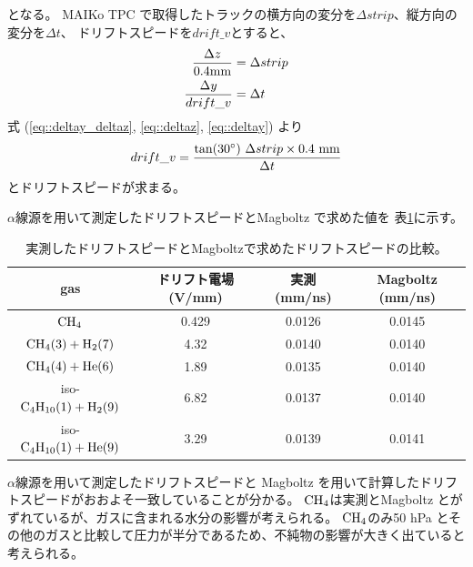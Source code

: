 \documentclass[../master]{subfiles}
\begin{document}
となる。
MAIKo TPC で取得したトラックの横方向の変分を$\Delta strip$、縦方向の変分を$\Delta t$、
ドリフトスピードを$drift\_v$とすると、
\begin{align}
  \frac{\Delta z}{0.4 {\rm mm}} & = \Delta strip \label{eq::deltaz}\\
  \frac{\Delta y}{drift\_v} & = \Delta t \label{eq::deltay}
\end{align}
式 (\ref{eq::deltay_deltaz}, \ref{eq::deltaz}, \ref{eq::deltay}) より
\begin{equation}
  drift\_v = \frac{\tan(30^{\circ})~\Delta strip\times0.4~{\rm mm}}{\Delta t}
\end{equation}
とドリフトスピードが求まる。

$\alpha$線源を用いて測定したドリフトスピードとMagboltz で求めた値を
表\ref{tab::drift_speed_compare}に示す。
\begin{table}
  \centering
  \caption{実測したドリフトスピードとMagboltzで求めたドリフトスピードの比較。}
  \label{tab::drift_speed_compare}
  \begin{tabular}{cccc}
    \toprule
    gas & ドリフト電場 (V/mm) & 実測 (mm/ns) & Magboltz (mm/ns)\\
    \midrule
    ${\rm CH_{4}}$ & 0.429 & 0.0126 & 0.0145 \\
    ${\rm CH_{4}} (3) + {\rm H_{2}} (7)$ & 4.32 & 0.0140 & 0.0140 \\
    ${\rm CH_{4}} (4) + {\rm He} (6)$ & 1.89 & 0.0135 & 0.0140 \\
    iso-${\rm C_{4}H_{10}} (1) + {\rm H_{2}} (9)$ & 6.82 & 0.0137 & 0.0140 \\
    iso-${\rm C_{4}H_{10}} (1) + {\rm He} (9)$ & 3.29 & 0.0139 & 0.0141 \\
    \bottomrule
  \end{tabular}
\end{table}
$\alpha$線源を用いて測定したドリフトスピードと Magboltz を用いて計算したドリフトスピードがおおよそ一致していることが分かる。
$\rm CH_{4}$は実測とMagboltz とがずれているが、ガスに含まれる水分の影響が考えられる。
$\rm CH_{4}$のみ50 hPa とその他のガスと比較して圧力が半分であるため、不純物の影響が大きく出ていると考えられる。
\end{document}
